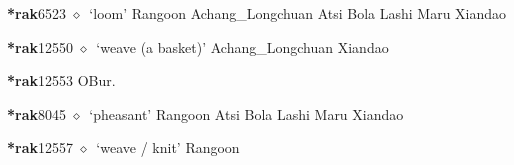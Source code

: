   \begin{list}{}{\leftmargin=1.5em \itemindent=-1.5em}
  \item {\footnotesize \textbf{*rak}}{\tiny 6523}
         $\diamond$~`loom'
         Rangoon 
\hspace{1ex}
         Achang\_Longchuan 
\hspace{1ex}
         Atsi 
\hspace{1ex}
         Bola 
\hspace{1ex}
         Lashi 
\hspace{1ex}
         Maru 
\hspace{1ex}
         Xiandao 
  \item {\footnotesize \textbf{*rak}}{\tiny 12550}
\hspace{1ex}
         $\diamond$~`weave (a basket)'
         Achang\_Longchuan 
\hspace{1ex}
         Xiandao 
  \item {\footnotesize \textbf{*rak}}{\tiny 12553}
\hspace{1ex}
         OBur. 
  \item {\footnotesize \textbf{*rak}}{\tiny 8045}
\hspace{1ex}
         $\diamond$~`pheasant'
         Rangoon 
\hspace{1ex}
         Atsi 
\hspace{1ex}
         Bola 
\hspace{1ex}
         Lashi 
\hspace{1ex}
         Maru 
\hspace{1ex}
         Xiandao 
  \item {\footnotesize \textbf{*rak}}{\tiny 12557}
\hspace{1ex}
         $\diamond$~`weave / knit'
         Rangoon 

\end{list}
